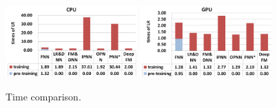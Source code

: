 \begin{figure}[ht]
\setlength{\abovecaptionskip}{0pt}%
\setlength{\belowcaptionskip}{-10pt}
\centering
\begin{minipage}[b]{0.5\textwidth}
\includegraphics[width=0.45\textwidth]{img/cpu-time.png}
\includegraphics[width=0.45\textwidth]{img/gpu-time.png}
\end{minipage}
\caption{\footnotesize{Time comparison.}}\label{fig:time}
\end{figure}

